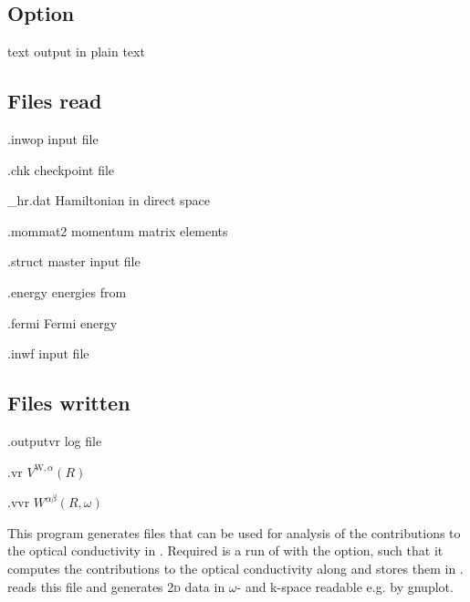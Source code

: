\subsection{Option}
\begin{options}
\item [\td text] output  in plain text
\end{options}

\subsection{Files read}
\begin{options}
\item[\case.inwop] input file
\item[\case.chk] \wannier checkpoint file
\item[\case{}\_hr.dat] Hamiltonian in direct space
\item[\case.mommat2] momentum matrix elements
\item[\case.struct] \wien master input file 
\item[\case.energy] energies from \lapwi {}
\item[\case.fermi] Fermi energy 
\item[\case.inwf] \wiiw input file 
\end{options}

\subsection{Files written}
\begin{options}
\item[\case.outputvr] log file
\item[\case.vr] $V^{\text{W},α}(R)$
\item[\case.vvr] $W^{αβ}(R, ω)$ 
\end{options}



This program generates files that can be used for analysis of the
contributions to the optical conductivity in \woptic.  Required is a
run of \woprog with the  option, such that it computes the
contributions to the optical conductivity along
 and stores them in
.  \kanalysis reads this file and
generates 2\textsc{d} data in $ω$- and k-space readable e.g. by
gnuplot.

